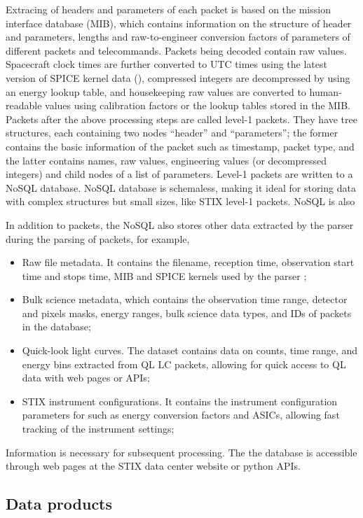 \documentclass[referee]{aa} %
\begin{document}
Extracing of headers and parameters of each packet is based on the mission interface database (MIB), which 
contains information on  the structure of header and parameters, 
lengths and raw-to-engineer conversion factors of parameters of different packets and telecommands. 
Packets being decoded contain raw values.
Spacecraft clock times are further converted to UTC times using 
the latest version of SPICE kernel data (\cite{spice1996,spice2018}), compressed integers are  
decompressed by using an energy lookup table,  and 
housekeeping raw values are converted to 
human-readable values using calibration factors or the lookup tables stored in the MIB. 
Packets after the above processing steps are called level-1 packets. They
have tree structures, each containing two nodes “header” and “parameters”;
the former contains the basic information  of the packet such as timestamp, packet type,
and the latter contains names, 
raw values, engineering values (or decompressed integers) and child nodes of a list of parameters.
Level-1 packets are written 
to a NoSQL database. 
NoSQL database is schemaless,  making it ideal for storing data with complex
structures but small sizes, like STIX level-1 packets.  
NoSQL is also 

In addition to packets, the NoSQL also stores other data extracted by the parser during the parsing of packets, 
for example, 
\begin{itemize}
  \item Raw file metadata. It contains the filename, reception time, observation start time and stops time, MIB and SPICE kernels used by the parser ; 
  \item Bulk science metadata, which contains the observation time range, detector and pixels masks, energy ranges, 
   bulk science data types, and IDs of packets in the database; 
  \item Quick-look light curves.  The dataset contains data on counts, time range, and energy bins extracted from QL LC packets, 
     allowing for quick access to QL data with web pages or APIs;
  \item STIX instrument configurations. 
  It contains the instrument configuration parameters for such as energy conversion factors and ASICs, 
  allowing fast tracking of the instrument settings;
\end{itemize}
Information is necessary for subsequent processing. The
the database is accessible through web pages at the STIX data center website or python APIs. 
\subsection{Data products}
\end{document}
